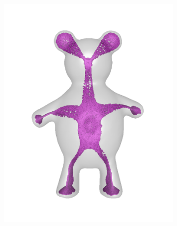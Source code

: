 \documentclass[review]{acmsiggraph}
\begin{document}
\begin{figure}
        \centering
		\begin{subfigure}[b]{0.19\linewidth}
                \centering
                \includegraphics[width=\textwidth]{images/bear/0.pdf}
       \end{subfigure}
		~
		\begin{subfigure}[b]{0.19\linewidth}
                \centering

\end{subfigure}
\end{figure}
\end{document}
